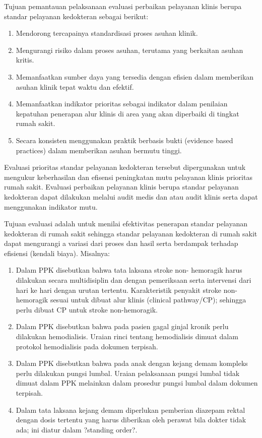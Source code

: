 \documentclass[
]{book}
\providecommand{\tightlist}{%
  \setlength{\itemsep}{0pt}\setlength{\parskip}{0pt}}
\begin{document}
Tujuan pemantauan pelaksanaan evaluasi perbaikan pelayanan klinis berupa standar pelayanan kedokteran sebagai berikut:

\begin{enumerate}
\def\labelenumi{\alph{enumi}.}
\tightlist
\item
  Mendorong tercapainya standardisasi proses asuhan klinik.
\item
  Mengurangi risiko dalam proses asuhan, terutama yang berkaitan asuhan kritis.
\item
  Memanfaatkan sumber daya yang tersedia dengan efisien dalam memberikan asuhan klinik tepat waktu dan efektif.
\item
  Memanfaatkan indikator prioritas sebagai indikator dalam penilaian kepatuhan penerapan alur klinis di area yang akan diperbaiki di tingkat rumah sakit.
\item
  Secara konsisten menggunakan praktik berbasis bukti (evidence based practices) dalam memberikan asuhan bermutu tinggi.
\end{enumerate}

Evaluasi prioritas standar pelayanan kedokteran tersebut dipergunakan untuk mengukur keberhasilan dan efisensi peningkatan mutu pelayanan klinis prioritas rumah sakit.
Evaluasi perbaikan pelayanan klinis berupa standar pelayanan kedokteran dapat dilakukan melalui audit medis dan atau audit klinis serta dapat menggunakan indikator mutu.

Tujuan evaluasi adalah untuk menilai efektivitas penerapan standar pelayanan kedokteran di rumah sakit sehingga standar pelayanan kedokteran di rumah sakit dapat mengurangi a variasi dari proses dan hasil serta berdampak terhadap efisiensi (kendali biaya). Misalnya:

\begin{enumerate}
\def\labelenumi{\alph{enumi}.}
\tightlist
\item
  Dalam PPK disebutkan bahwa tata laksana stroke non- hemoragik harus dilakukan secara multidisiplin dan dengan pemeriksaan serta intervensi dari hari ke hari dengan urutan tertentu. Karakteristik penyakit stroke non-hemoragik sesuai untuk dibuat alur klinis (clinical pathway/CP); sehingga perlu dibuat CP untuk stroke non-hemoragik.
\item
  Dalam PPK disebutkan bahwa pada pasien gagal ginjal kronik perlu dilakukan hemodialisis. Uraian rinci tentang hemodialisis dimuat dalam protokol hemodialisis pada dokumen terpisah.
\item
  Dalam PPK disebutkan bahwa pada anak dengan kejang demam kompleks perlu dilakukan pungsi lumbal. Uraian pelaksanaan pungsi lumbal tidak dimuat dalam PPK melainkan dalam prosedur pungsi lumbal dalam dokumen terpisah.
\item
  Dalam tata laksana kejang demam diperlukan pemberian diazepam rektal dengan dosis tertentu yang harus diberikan oleh perawat bila dokter tidak ada; ini diatur dalam ?standing order?.
\end{enumerate}
\end{document}
